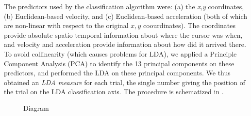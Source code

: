 \documentclass{article}
\begin{document}
The predictors used by the classification algorithm were: (a) the \textit{x,y} coordinates, (b) Euclidean-based velocity, and (c) Euclidean-based acceleration (both of which are non-linear with respect to the original $x,y$ coourdinates). The coordinates provide absolute spatio-temporal information about where the cursor was when, and velocity and acceleration provide information about how did it arrived there.
To avoid collinearity (which causes problems for LDA), we applied a Principle Component Analysis (PCA) to identify the 13 principal components on these predictors, and performed the LDA on these principal components. 
We thus obtained an \emph{LDA measure} for each trial, the single number giving the position of the trial on the LDA classification  axis.
The procedure is schematized in .

\begin{figure}

\caption{Diagram}\label{fig:diagram}
\end{figure}
\end{document}
